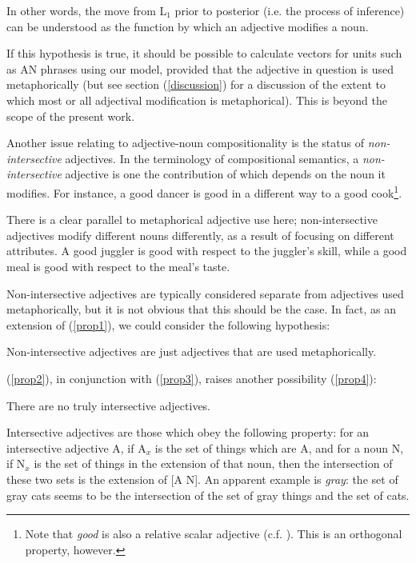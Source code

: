 \documentclass[10pt,letterpaper,twocolumn]{article}
\begin{document}
In other words, the move from L$_1$ prior to posterior (i.e. the process of inference) can be understood as the function by which an adjective modifies a noun.

If this hypothesis is true, it should be possible to calculate vectors for units such as AN phrases using our model, provided that the adjective in question is used metaphorically (but see section (\ref{discussion}) for a discussion of the extent to which most or all adjectival modification is metaphorical). This is beyond the scope of the present work.


Another issue relating to adjective-noun compositionality is the status of \emph{non-intersective} adjectives. In the terminology of compositional semantics, a \emph{non-intersective} adjective is one the contribution of which depends on the noun it modifies. For instance, a good dancer is good in a different way to a good cook\footnote{Note that \emph{good} is also a relative scalar adjective (c.f. \cite{kennedy}). This is an orthogonal property, however.}. 

There is a clear parallel to metaphorical adjective use here; non-intersective adjectives modify different nouns differently, as a result of focusing on different attributes. A good juggler is good with respect to the juggler's skill, while a good meal is good with respect to the meal's taste.

Non-intersective adjectives are typically considered separate from adjectives used metaphorically, but it is not obvious that this should be the case. In fact, as an extension of (\ref{prop1}), we could consider the following hypothesis:

\begin{exe}
\ex Non-intersective adjectives are just adjectives that are used metaphorically. \label{prop2}
\end{exe}

(\ref{prop2}), in conjunction with (\ref{prop3}), raises another possibility (\ref{prop4}):

\begin{exe}
\ex There are no truly intersective adjectives. \label{prop4}
\end{exe}

Intersective adjectives are those which obey the following property: for an intersective adjective A, if A$_x$ is the set of things which are A, and for a noun N, if N$_x$ is the set of things in the extension of that noun, then the intersection of these two sets is the extension of [A N]. An apparent example is \emph{gray}: the set of gray cats seems to be the intersection of the set of gray things and the set of cats.
\end{document}
